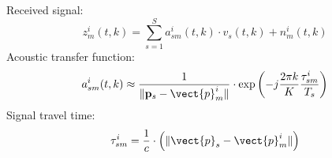 Received signal:
\begin{equation}
	z_m^i(t,k)=\sum_{s=1}^{S}a_{sm}^i(t,k)\cdot v_s(t,k)+n_m^i(t,k)
\end{equation}
Acoustic transfer function:
\begin{equation}
	a_{sm}^i(t,k)\approx\frac{1}{\|\mathbf{p}_s-\vect{p}_m^i\|}\cdot\exp{\left(-j\frac{2\pi k}{K}\frac{\tau^i_{sm}}{T_s}\right)}
\end{equation}
Signal travel time:
\begin{equation}
	\tau^i_{sm}=\frac{1}{c}\cdot\left(\|\vect{p}_s-\vect{p}_m^i\|\right)
\end{equation}
